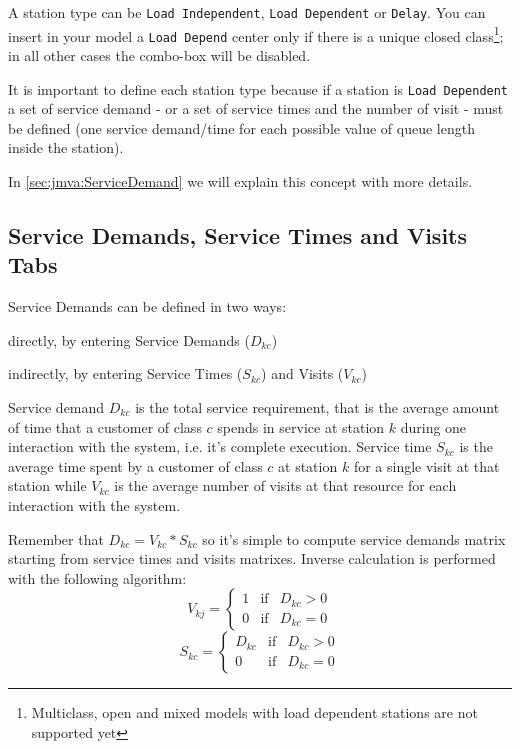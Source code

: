 A station type can be \texttt{Load Independent}, \texttt{Load
Dependent} or \texttt{Delay}. You can insert in your model a
\texttt{Load Depend} center only if there is a unique closed
class\footnote{Multiclass, open and mixed models with load dependent
stations are not supported yet}; in all other cases the combo-box
will be disabled.

It is important to define each station type because if a station is
\texttt{Load Dependent} a set of service demand - or a set of
service times and the number of visit - must be defined (one service
demand/time for each possible value of queue length inside the
station).

In \autoref{sec:jmva:ServiceDemand} we will explain this concept
with more details.

\subsection{Service Demands, Service Times and Visits Tabs}
\label{sec:jmva:ServiceDemand} Service Demands can be defined in two
ways:
\begin{itemize*}
\item directly, by entering Service Demands ($D_{kc}$)
\item indirectly, by entering Service Times ($S_{kc}$) and Visits ($V_{kc}$)
\end{itemize*}

Service demand $D_{kc}$ is the total service requirement, that is
the average amount of time that a customer of class $c$ spends in
service at station $k$ during one interaction with the system, i.e.
it's complete execution. Service time $S_{kc}$ is the average time
spent by a customer of class $c$ at station $k$ for a single visit
at that station while $V_{kc}$ is the average number of visits at
that resource for each interaction with the system.

Remember that $D_{kc} = V_{kc} * S_{kc}$ so it's simple to compute
service demands matrix starting from service times and visits
matrixes. Inverse calculation is performed with the following
algorithm:
\[
V_{kj} = \left\{
\begin{array}{ccl} 1 & \textrm{if} & D_{kc} > 0 \\
0 & \textrm{if} & D_{kc} = 0 \end{array}\right.
\]
\[
S_{kc} = \left\{ \begin{array}{ccl} D_{kc} & \textrm{if} & D_{kc}
> 0 \\ 0 & \textrm{if} & D_{kc} = 0 \end{array}\right.
\]

